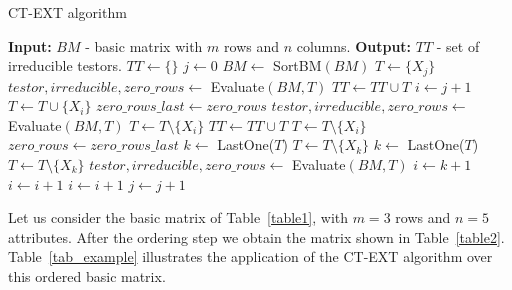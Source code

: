 \documentclass[authoryear,preprint,review,12pt]{elsarticle}
\begin{document}
\begin{algorithm}
\begin{spacing}{1.0}
\begin{small}
\caption{CT-EXT algorithm}\label{ctext_algo}
\begin{algorithmic}[1]
\State \textbf{Input: } $BM$ - basic matrix with $m$ rows and $n$ columns.
\State \textbf{Output: } $TT$ - set of irreducible testors.
\State $TT \gets \{\}$
\State $j \gets 0$ 
\State $BM \gets$ SortBM$(BM)$
\label{row1condition}
\State $T \gets \{X_j\}$ 
\State $testor, irreducible, zero\_rows \gets$ Evaluate$(BM,T)$
 
\State $TT \gets TT \cup T$
\EndIf
\Else
\State $i \gets j+1$
\State $T \gets T \cup \{X_i\}$
\State $zero\_rows\_last \gets zero\_rows$
\State $testor, irreducible, zero\_rows \gets$ Evaluate$(BM,T)$
\State $T \gets T \setminus \{X_i\}$ 
\Else
{}
\State $TT \gets TT \cup T$
\EndIf
\State $T \gets T \setminus \{X_i\}$
\State $zero\_rows \gets zero\_rows\_last$
\EndIf
\EndIf
{}
\State $k \gets$ LastOne($T$)
\State $T \gets T \setminus \{X_k\}$
\State $k \gets$ LastOne($T$)
\EndIf
{}
\State $T \gets T \setminus \{X_k\}$
\State $testor, irreducible, zero\_rows \gets$ Evaluate$(BM,T)$
\State $i \gets k+1$
\Else
\State $i \gets i+1$
\EndIf
\Else
\State $i \gets i+1$
\EndIf
\EndWhile
\EndIf
\State $j \gets j+1$
\EndWhile
\end{algorithmic}
\end{small}
\end{spacing}
\end{algorithm}

Let us consider the basic matrix of Table~\ref{table1}, with $m=3$ rows and $n=5$ attributes. After the ordering step we obtain the matrix shown in Table~\ref{table2}. Table~\ref{tab_example} illustrates the
application of the CT-EXT algorithm over this ordered basic matrix.
\end{document}
